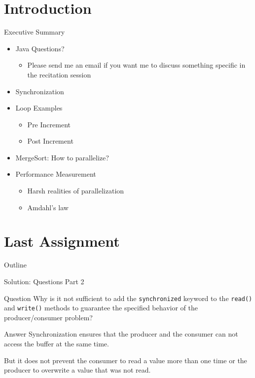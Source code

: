 \section*{Introduction}

\begin{frame}{Executive Summary}
  \begin{itemize}
  \item Java Questions?
    \begin{itemize}
    \item Please send me an email if you want me to discuss something
      specific in the recitation session
    \end{itemize}
  \item Synchronization
  \item Loop Examples
    \begin{itemize}
    \item Pre Increment
    \item Post Increment
    \end{itemize}
  \item MergeSort: How to parallelize?
  \item Performance Measurement
    \begin{itemize}
    \item Harsh realities of parallelization
    \item Amdahl's law
    \end{itemize}
  \end{itemize}
\end{frame}


\section{Last Assignment}

\begin{frame}{Outline}
  \tableofcontents[current]
\end{frame}

\begin{frame}{Solution: Questions Part 2}
  \begin{block}{Question}
    Why is it not sufficient to add the \lstinline!synchronized!
    keyword to the \lstinline!read()! and \lstinline!write()! methods
    to guarantee the specified behavior of the producer/consumer
    problem?
  \end{block}


  \pause

  \begin{exampleblock}{Answer}
    Synchronization ensures that the producer and the consumer can not
    access the buffer at the same time.

    But it does not prevent the consumer to read a value more than one
    time or the producer to overwrite a value that was not read.
  \end{exampleblock}
\end{frame}

